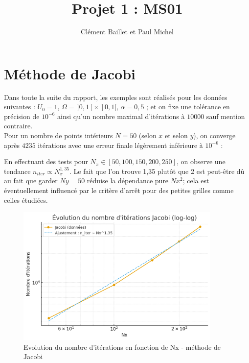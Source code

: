 \documentclass{article}
\title{Projet 1 : MS01}
\author{Clément Baillet et Paul Michel}
\date{}
\begin{document}
\maketitle

\section{Méthode de Jacobi}
Dans toute la suite du rapport, les exemples sont réalisés pour les données suivantes : $U_0 = 1$, $\Omega = \,]0, 1[ \times \,]0, 1[$, $\alpha = 0,5$ ; et on fixe une tolérance en précision de $10^{-6}$ ainsi qu'un nombre maximal d'itérations à $10 000$ sauf mention contraire. \\
Pour un nombre de points intérieurs $N = 50$ (selon $x$ et selon $y$), on converge après $4235$ itérations avec une erreur finale légèrement inférieure à $10^{-6}$ :


En effectuant des tests  pour $N_x \in [50,100,150,200,250]$, on observe une tendance $n_{iter} \propto N_x^{1,35}$. Le fait que l'on trouve 1,35 plutôt que 2 est peut-être dû au fait que garder $Ny=50$ réduise la dépendance pure $Nx^2$; cela est éventuellement influencé par le critère d'arrêt pour des petites grilles comme celles étudiées.

\begin{figure}[H]
    \centering
    \includegraphics[width=0.9\textwidth]{courbe_log_log_jacobi.png}
    \caption{Evolution du nombre d'itérations en fonction de Nx - méthode de Jacobi}
    \label{fig:placeholder}
\end{figure}
\end{document}
